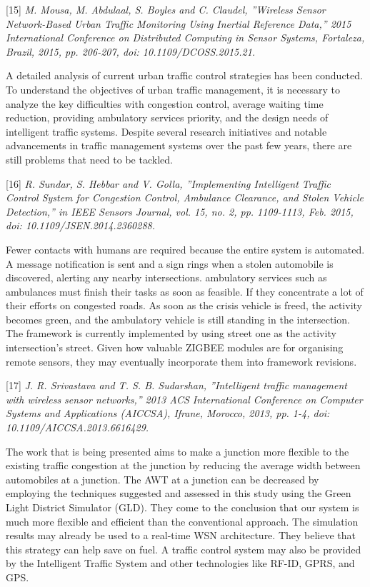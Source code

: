 \documentclass[conference]{IEEEtran}
\begin{document}
[15]\emph{ M. Mousa, M. Abdulaal, S. Boyles and C. Claudel,
”Wireless Sensor Network-Based Urban Traffic Monitoring
Using Inertial Reference Data,” 2015 International Conference on Distributed Computing in Sensor Systems, Fortaleza,
Brazil, 2015, pp. 206-207, doi: 10.1109/DCOSS.2015.21.
}

A detailed analysis of current urban traffic control strategies has been conducted. To understand the objectives of urban traffic management, it is necessary to analyze the key difficulties with congestion control, average waiting time reduction, providing ambulatory services priority, and the design needs of intelligent traffic systems. Despite several research initiatives and notable advancements in traffic management systems over the past few years, there are still problems that need to be tackled.

[16]\emph{ R. Sundar, S. Hebbar and V. Golla, ”Implementing
Intelligent Traffic Control System for Congestion Control,
Ambulance Clearance, and Stolen Vehicle Detection,” in IEEE
Sensors Journal, vol. 15, no. 2, pp. 1109-1113, Feb. 2015, doi:
10.1109/JSEN.2014.2360288.}

Fewer contacts with humans are required because the entire system is automated. A message notification is sent and a sign rings when a stolen automobile is discovered, alerting any nearby intersections. ambulatory services such as ambulances must finish their tasks as soon as feasible. If they concentrate a lot of their efforts on congested roads. As soon as the crisis vehicle is freed, the activity becomes green, and the ambulatory vehicle is still standing in the intersection. The framework is currently implemented by using street one as the activity intersection's street. Given how valuable ZIGBEE modules are for organising remote sensors, they may eventually incorporate them into framework revisions.

[17]\emph{ J. R. Srivastava and T. S. B. Sudarshan, ”Intelligent traffic management with wireless sensor networks,”
2013 ACS International Conference on Computer Systems and
Applications (AICCSA), Ifrane, Morocco, 2013, pp. 1-4, doi:
10.1109/AICCSA.2013.6616429. }

The work that is being presented aims to make a junction more flexible to the existing traffic congestion at the junction by reducing the average width between automobiles at a junction. The AWT at a junction can be decreased by employing the techniques suggested and assessed in this study using the Green Light District Simulator (GLD). They come to the conclusion that our system is much more flexible and efficient than the conventional approach. The simulation results may already be used to a real-time WSN architecture. They believe that this strategy can help save on fuel. A traffic control system may also be provided by the Intelligent Traffic System and other technologies like RF-ID, GPRS, and GPS.
\end{document}
